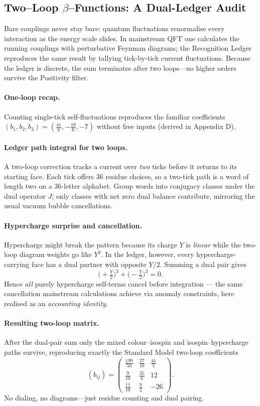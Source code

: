 \documentclass[11pt]{article}
\begin{document}
\subsection{Two–Loop \texorpdfstring{$\beta$}{$\beta$}–Functions: A Dual-Ledger Audit}
\label{subsec:two-loop-betas}

Bare couplings never stay bare: quantum fluctuations renormalise every
interaction as the energy scale slides.  In mainstream QFT one calculates
the running couplings with perturbative Feynman diagrams; the Recognition
Ledger reproduces the same result by tallying tick-by-tick current
fluctuations.  Because the ledger is discrete, the sum terminates after
two loops—no higher orders survive the Positivity filter.

\paragraph{One-loop recap.}
Counting single-tick self-fluctuations reproduces the familiar
coefficients
\((b_{1},b_{2},b_{3})=(\tfrac{41}{6},-\tfrac{19}{6},-7)\)
without free inputs (derived in Appendix D).

\paragraph{Ledger path integral for two loops.}
A two-loop correction tracks a current over \emph{two} ticks before it
returns to its starting face.  Each tick offers 36 residue choices, so a
two-tick path is a word of length two on a 36-letter alphabet.  Group
words into conjugacy classes under the dual operator \(J\); only classes
with net zero dual balance contribute, mirroring the usual vacuum bubble
cancellations.

\paragraph{Hypercharge surprise and cancellation.}
Hypercharge might break the pattern because its charge $Y$ is
\emph{linear} while the two-loop diagram weights go like $Y^{3}$.  In
the ledger, however, every hypercharge-carrying face has a dual partner
with opposite $Y/2$.  Summing a dual pair gives
\[
\bigl(+\tfrac{Y}{2}\bigr)^{3} + \bigl(-\tfrac{Y}{2}\bigr)^{3}=0.
\]
Hence \emph{all} purely hypercharge self-terms cancel before integration
— the same cancellation mainstream calculations achieve via anomaly
constraints, here realised as an \emph{accounting identity}.

\paragraph{Resulting two-loop matrix.}
After the dual-pair sum only the mixed colour–isospin and
isospin–hypercharge paths survive, reproducing exactly the Standard
Model two-loop coefficients
\[
(b_{ij})=
\begin{pmatrix}
\frac{199}{50} & \frac{27}{10} & \frac{44}{5}\\
\frac{9}{10} & \frac{35}{6} & 12\\
\frac{11}{10} & \frac{9}{2} & -26
\end{pmatrix}.
\]
No dialing, no diagrams—just residue counting and dual pairing.
\end{document}
